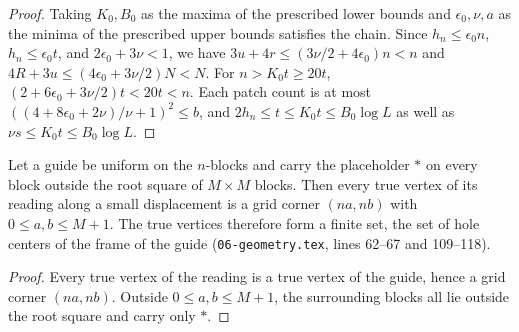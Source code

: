 \begin{proof}\leanok
    Taking $K_0,B_0$ as the maxima of the prescribed lower bounds and $\epsilon_0,\nu,a$ as the minima of the prescribed upper bounds satisfies the chain. Since $h_n\le\epsilon_0n$,
    $h_n\le\epsilon_0t$, and $2\epsilon_0+3\nu<1$, we have
    $3u+4r\le(3\nu/2+4\epsilon_0)n<n$ and $4R+3u\le(4\epsilon_0+3\nu/2)N<N$. For $n>K_0t\ge20t$, $(2+6\epsilon_0+3\nu/2)t<20t<n$. Each patch count is at most $((4+8\epsilon_0+2\nu)/\nu+1)^2\le b$, and $2h_n\le t\le K_0t\le B_0\log L$ as well as $\nu s\le K_0t\le B_0\log L$.
\end{proof}

\begin{lemma}
    \label{lem:peps_level_true_vertices}
    \leanok
    Let a guide be uniform on the $n$-blocks and carry the placeholder $\ast$ on every
    block outside the root square of $M\times M$ blocks. Then every true vertex
    of its reading along a small displacement is a grid corner $(na,nb)$ with
    $0\le a,b\le M+1$. The true vertices therefore form a finite set, the set of
    hole centers of the frame of the guide (\texttt{06-geometry.tex}, lines
    62--67 and 109--118).
\end{lemma}

\begin{proof}\leanok
    Every true vertex of the reading is a true vertex of the guide, hence a grid
    corner $(na,nb)$. Outside $0\le a,b\le M+1$, the surrounding blocks all lie outside the root square and carry only $\ast$.
\end{proof}

